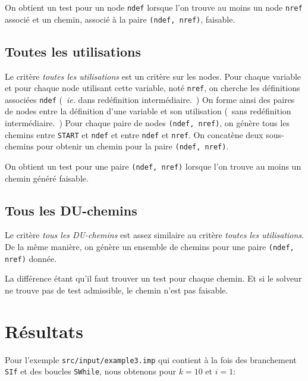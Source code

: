 On obtient un test pour un node \texttt{ndef} lorsque l'on trouve au moins un
node \texttt{nref} associé et un chemin, associé à la paire
\texttt{(ndef, nref)}, faisable.

\subsection{Toutes les utilisations}

Le critère \textit{toutes les utilisations} est un critère sur les nodes. Pour
chaque variable et pour chaque node utilisant cette variable, noté
\texttt{nref}, on cherche les définitions associées \texttt{ndef}
(~\textit{ie.} dans redéfinition intermédiaire.~) On forme ainsi des paires de
nodes entre la définition d'une variable et son utilisation (~sans redéfinition
intermédiaire.~) Pour chaque paire de nodes \texttt{(ndef, nref)}, on génère
tous les chemins entre \texttt{START} et \texttt{ndef} et entre \texttt{ndef}
et \texttt{nref}. On concatène deux sous-chemins pour obtenir un chemin pour la
paire \texttt{(ndef, nref)}.

On obtient un test pour une paire \texttt{(ndef, nref)} lorsque l'on trouve au
moins un chemin généré faisable.

\subsection{Tous les DU-chemins}

Le critère \textit{tous les DU-chemins} est assez similaire au critère
\textit{toutes les utilisations}. De la même manière, on génère un ensemble de
chemins pour une paire \texttt{(ndef, nref)} donnée.

La différence étant qu'il faut trouver un test pour chaque chemin. Et si le
solveur ne trouve pas de test admissible, le chemin n'est pas faisable.

\section{Résultats}

Pour l'exemple \texttt{src/input/example3.imp} qui contient à la fois des
branchement \texttt{SIf} et des boucles \texttt{SWhile}, nous obtenons pour
$k = 10$ et $i = 1$:

\bigskip

